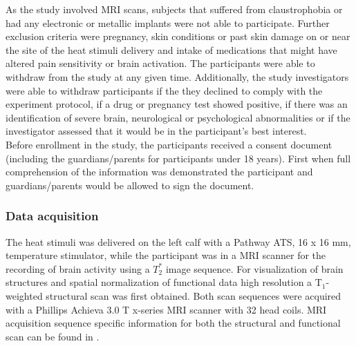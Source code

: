 As the study involved MRI scans, subjects that suffered from claustrophobia or had any electronic or metallic implants were not able to participate. Further exclusion criteria were pregnancy, skin conditions or past skin damage on or near the site of the heat stimuli delivery and intake of medications that might have altered pain sensitivity or brain activation. The participants were able to withdraw from the study at any given time. Additionally, the study investigators were able to withdraw participants if the they declined to comply with the experiment protocol, if a drug or pregnancy test showed positive, if there was an identification of severe brain, neurological or psychological abnormalities or if the investigator assessed that it would be in the participant's best interest. \\
Before enrollment in the study, the participants received a consent document (including the guardians/parents for participants under 18 years). First when full comprehension of the information was demonstrated the participant and guardians/parents would be allowed to sign the document.

\subsubsection{Data acquisition} \label{ac} 

The heat stimuli was delivered on the left calf with a Pathway ATS, 16 x 16 mm, temperature stimulator, while the participant was in a MRI scanner for the recording of brain activity using a $T_{2}^*$ image sequence. For visualization of brain structures and spatial normalization of functional data high resolution a T$_1$-weighted structural scan was first obtained. Both scan sequences were acquired with a Phillips Achieva 3.0 T x-series MRI scanner with 32 head coils. MRI acquisition sequence specific information for both the structural and functional scan can be found in .   

